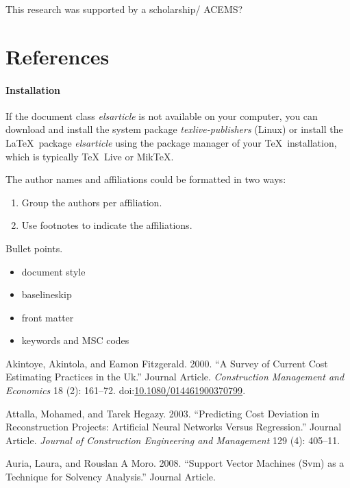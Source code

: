 \documentclass[]{elsarticle} %
\begin{document}
This research was supported by a scholarship/ ACEMS?

\section*{References}\label{references}

\paragraph{Installation}\label{installation}

If the document class \emph{elsarticle} is not available on your
computer, you can download and install the system package
\emph{texlive-publishers} (Linux) or install the LaTeX~package
\emph{elsarticle} using the package manager of your TeX~installation,
which is typically TeX~Live or MikTeX.

The author names and affiliations could be formatted in two ways:

\begin{enumerate}
\def\labelenumi{(\arabic{enumi})}
\item
  Group the authors per affiliation.
\item
  Use footnotes to indicate the affiliations.
\end{enumerate}

Bullet points.

\begin{itemize}
\item
  document style
\item
  baselineskip
\item
  front matter
\item
  keywords and MSC codes
\end{itemize}

\hypertarget{refs}{}
\hypertarget{ref-Akintoye2000}{}
Akintoye, Akintola, and Eamon Fitzgerald. 2000. ``A Survey of Current
Cost Estimating Practices in the Uk.'' Journal Article.
\emph{Construction Management and Economics} 18 (2): 161--72.
doi:\href{https://doi.org/10.1080/014461900370799}{10.1080/014461900370799}.

\hypertarget{ref-Attalla2003}{}
Attalla, Mohamed, and Tarek Hegazy. 2003. ``Predicting Cost Deviation in
Reconstruction Projects: Artificial Neural Networks Versus Regression.''
Journal Article. \emph{Journal of Construction Engineering and
Management} 129 (4): 405--11.

\hypertarget{ref-Auria2008}{}
Auria, Laura, and Rouslan A Moro. 2008. ``Support Vector Machines (Svm)
as a Technique for Solvency Analysis.'' Journal Article.
\end{document}
